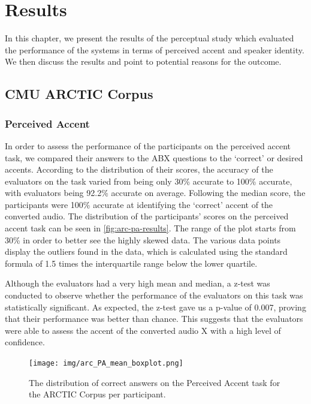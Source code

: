 \documentclass
[
    a4paper,
    twoside,
    12pt,
]
{report}
\begin{document}
\chapter{Results}

In this chapter, we present the results of the perceptual study which
evaluated the performance of the systems in terms of perceived accent
and speaker identity. We then discuss the results and point to potential
reasons for the outcome.

\hypertarget{cmu-arctic-corpus}{%
\section{CMU ARCTIC Corpus}\label{cmu-arctic-corpus}}

\hypertarget{perceived-accent}{%
\subsection{Perceived Accent}\label{perceived-accent}}

In order to assess the performance of the participants on the perceived
accent task, we compared their answers to the ABX questions to the
`correct' or desired accents. According to the distribution of their
scores, the accuracy of the evaluators on the task varied from being
only 30\% accurate to 100\% accurate, with evaluators being 92.2\%
accurate on average. Following the median score, the participants were
100\% accurate at identifying the `correct' accent of the converted
audio. The distribution of the participants' scores on the perceived
accent task can be seen in \autoref{fig:arc-pa-results}. The range of
the plot starts from 30\% in order to better see the highly skewed data.
The various data points display the outliers found in the data, which is
calculated using the standard formula of 1.5 times the interquartile
range below the lower quartile.

Although the evaluators had a very high mean and median, a z-test was
conducted to observe whether the performance of the evaluators on this
task was statistically significant. As expected, the z-test gave us a
p-value of 0.007, proving that their performance was better than chance.
This suggests that the evaluators were able to assess the accent of the
converted audio X with a high level of confidence.

\begin{figure}[]
\centering
\texttt{[image: img/arc\_PA\_mean\_boxplot.png]}
\caption{The distribution of correct answers on the Perceived Accent task for the ARCTIC Corpus per participant.}
\label{fig:arc-pa-results}
\end{figure}
\end{document}
